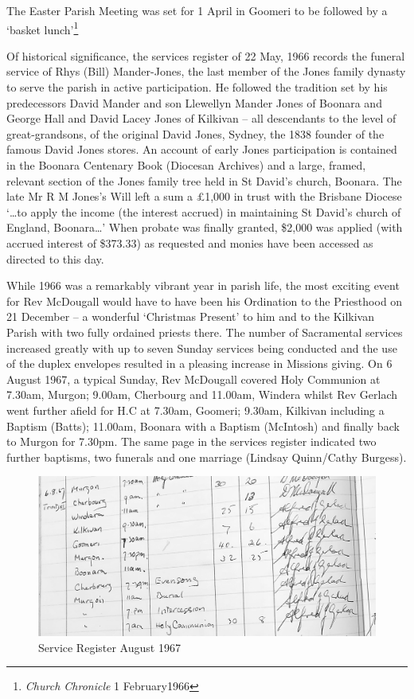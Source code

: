 The Easter Parish Meeting was set for 1 April in Goomeri to be followed
by a `basket lunch'\footnote{\emph{Church Chronicle} 1 February1966}

Of historical significance, the services register of 22 May, 1966
records the funeral service of Rhys (Bill) Mander-Jones, the last member
of the Jones family dynasty to serve the parish in active participation.
He followed the tradition set by his predecessors David Mander and son
Llewellyn Mander Jones of Boonara and George Hall and David Lacey Jones
of Kilkivan -- all descendants to the level of great-grandsons, of the
original David Jones, Sydney, the 1838 founder of the famous David Jones
stores. An account of early Jones participation is contained in the
Boonara Centenary Book (Diocesan Archives) and a large, framed, relevant
section of the Jones family tree held in St David's church, Boonara. The
late Mr R M Jones's Will left a sum a \pounds1,000 in trust with the Brisbane
Diocese `\ldots to apply the income (the interest accrued) in
maintaining St David's church of England, Boonara\ldots' When probate
was finally granted, \$2,000 was applied (with accrued interest of
\$373.33) as requested and monies have been accessed as directed to this
day.

While 1966 was a remarkably vibrant year in parish life, the most
exciting event for Rev McDougall would have to have been his Ordination
to the Priesthood on 21 December -- a wonderful `Christmas Present' to
him and to the Kilkivan Parish with two fully ordained priests there.
The number of Sacramental services increased greatly with up to seven
Sunday services being conducted and the use of the duplex envelopes
resulted in a pleasing increase in Missions giving. On 6 August 1967, a
typical Sunday, Rev McDougall covered Holy Communion at 7.30am, Murgon;
9.00am, Cherbourg and 11.00am, Windera whilst Rev Gerlach went further
afield for H.C at 7.30am, Goomeri; 9.30am, Kilkivan including a Baptism
(Batts); 11.00am, Boonara with a Baptism (McIntosh) and finally back to
Murgon for 7.30pm. The same page in the services register indicated two
further baptisms, two funerals and one marriage (Lindsay Quinn/Cathy
Burgess).




\begin{figure}[!h]
\begin{center}
\includegraphics[width=.7\textwidth,center]{images/serviceRegisterAug1967.jpg}
\caption{Service Register August 1967}
\end{center}
\end{figure}


